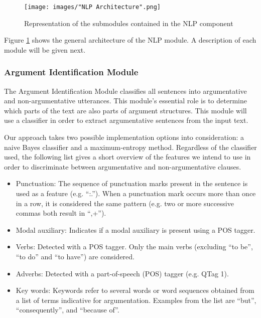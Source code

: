 \begin{figure}
\texttt{[image: images/"NLP Architecture".png]}
\caption{Representation of the submodules contained in the NLP component}
\label{fig:NLPArchitecture}
\end{figure}

Figure \ref{fig:NLPArchitecture} shows the general architecture of the NLP module. A description of each module will be given next.

\subsubsection{Argument Identification Module}
\par
The Argument Identification Module classifies all sentences into argumentative and non-argumentative utterances. This module's essential role is to determine which parts of the text are also parts of argument structures.
This module will use a classifier in order to extract argumentative sentences from the input text. 

\par
Our approach takes two possible implementation options into consideration: a naive Bayes classifier and a maximum-entropy method. Regardless of the classifier used, the following list gives a short overview of the features
we intend to use in order to discriminate between argumentative and non-argumentative clauses.

\begin{itemize}
\item Punctuation: The sequence of punctuation marks present in the sentence is used as a feature (e.g. ``:.''). When a punctuation mark occurs more than once in a row, it is considered the same pattern (e.g. two or more successive commas both result in ``,+'').
\item Modal auxiliary: Indicates if a modal auxiliary is present using a POS tagger.
\item Verbs: Detected with a POS tagger. Only the main verbs (excluding ``to be'', ``to do'' and ``to have'') are considered.
\item Adverbs: Detected with a part-of-speech (POS) tagger (e.g. QTag 1).
\item Key words:  Keywords refer to several words or word sequences obtained from a list of terms indicative for argumentation. Examples from the list are ``but'', ``consequently'', and ``because of''.
\end{itemize}

